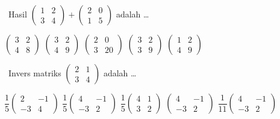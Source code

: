 \documentclass[11pt,a4paper]{exam}
\newcommand{\Fund}{{\footnotesize\textsf{\textcolor{hijau}{[Fundamental]}}}\ }
\newcommand{\Inter}{{\footnotesize\textsf{\textcolor{biru}{[Intermediate]}}}\ }
\begin{document}
\begin{questions}
\question \Fund Hasil $\begin{pmatrix} 1 & 2\\ 3 & 4 \end{pmatrix} +
\begin{pmatrix} 2 & 0\\ 1 & 5 \end{pmatrix}$ adalah \dots
\begin{choices}
\choice $\begin{pmatrix} 3 & 2\\ 4 & 8 \end{pmatrix}$
\CorrectChoice $\begin{pmatrix} 3 & 2\\ 4 & 9 \end{pmatrix}$
\choice $\begin{pmatrix} 2 & 0\\ 3 & 20 \end{pmatrix}$
\choice $\begin{pmatrix} 3 & 2\\ 3 & 9 \end{pmatrix}$
\choice $\begin{pmatrix} 1 & 2\\ 4 & 9 \end{pmatrix}$
\end{choices}

\question \Inter Invers matriks $\begin{pmatrix} 2 & 1\\ 3 & 4 \end{pmatrix}$ adalah \dots
\begin{choices}
\choice $\dfrac{1}{5}\begin{pmatrix} 2 & -1\\ -3 & 4 \end{pmatrix}$
\CorrectChoice $\dfrac{1}{5}\begin{pmatrix} 4 & -1\\ -3 & 2 \end{pmatrix}$
\choice $\dfrac{1}{5}\begin{pmatrix} 4 & 1\\ 3 & 2 \end{pmatrix}$
\choice $\begin{pmatrix} 4 & -1\\ -3 & 2 \end{pmatrix}$
\choice $\dfrac{1}{11}\begin{pmatrix} 4 & -1\\ -3 & 2 \end{pmatrix}$
\end{choices}


\end{questions}
\end{document}
